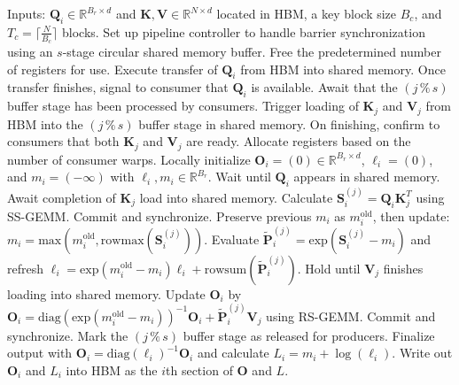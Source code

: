 \begin{algorithm}[H]
    \caption{\small\label{alg:flash3_wgmma_ws_only}\textsc{FlashAttention-3} forward pass \textbf{excluding} intra-consumer overlap -- CTA perspective}
    \begin{algorithmic}[1]
\REQUIRE Inputs: $\mathbf{Q}_i \in \mathbb{R}^{B_r \times d}$ and $\mathbf{K}, \mathbf{V} \in \mathbb{R}^{N \times d}$ located in HBM, a key block size $B_c$, and $T_c = \lceil \frac{N}{B_c} \rceil$ blocks.
\STATE Set up pipeline controller to handle barrier synchronization using an $s$-stage circular shared memory buffer.
\STATE Free the predetermined number of registers for use.
\STATE Execute transfer of $\mathbf{Q}_i$ from HBM into shared memory.
\STATE Once transfer finishes, signal to consumer that $\mathbf{Q}_i$ is available.
    \STATE Await that the $(j\,\%\,s)$ buffer stage has been processed by consumers.
    \STATE Trigger loading of $\mathbf{K}_j$ and $\mathbf{V}_j$ from HBM into the $(j\,\%\,s)$ buffer stage in shared memory.
    \STATE On finishing, confirm to consumers that both $\mathbf{K}_j$ and $\mathbf{V}_j$ are ready.
\ENDFOR
\ELSE \STATE Allocate registers based on the number of consumer warps.
\STATE Locally initialize $\mathbf{O}_i = (0) \in \mathbb{R}^{B_r \times d}$, $\ell_i = (0)$, and $m_i = (-\infty)$ with $\ell_i, m_i \in \mathbb{R}^{B_r}$.
\STATE Wait until $\mathbf{Q}_i$ appears in shared memory.
\STATE Await completion of $\mathbf{K}_j$ load into shared memory.
\STATE Calculate $\mathbf{S}_i^{(j)} = \mathbf{Q}_i \mathbf{K}_j^T$ using SS-GEMM. Commit and synchronize. \label{alg:ws_only_gemm1}
\STATE Preserve previous $m_i$ as $m_i^{\mathrm{old}}$, then update: $m_i = \mathrm{max}(m_i^{\mathrm{old}}, \mathrm{rowmax}(\mathbf{S}_i^{(j)}))$. \label{code-ws:softmax_start}
\STATE Evaluate $\widetilde{\mathbf{P}}_i^{(j)} = \mathrm{exp}(\mathbf{S}_i^{(j)} - m_i)$ and refresh $\ell_i = \mathrm{exp}(m_i^{\mathrm{old}} - m_i) \ell_i + \mathrm{rowsum}(\widetilde{\mathbf{P}}_i^{(j)})$. \label{code-ws:softmax_end}
\STATE Hold until $\mathbf{V}_j$ finishes loading into shared memory.
\STATE Update $\mathbf{O}_i$ by $\mathbf{O}_i = \mathrm{diag}(\mathrm{exp}(m_i^{\mathrm{old}} - m_i))^{-1} \mathbf{O}_i + \widetilde{\mathbf{P}}_i^{(j)} \mathbf{V}_j$ using RS-GEMM. Commit and synchronize. \label{alg:ws_only_gemm2}
\STATE Mark the $(j\,\%\,s)$ buffer stage as released for producers.
\ENDFOR
\STATE Finalize output with $\mathbf{O}_i = \mathrm{diag}(\ell_i)^{-1} \mathbf{O}_i$ and calculate $L_i = m_i + \log(\ell_i)$.
\STATE Write out $\mathbf{O}_i$ and $L_i$ into HBM as the $i$th section of $\mathbf{O}$ and $L$.
\ENDIF
\end{algorithmic}
\end{algorithm}

